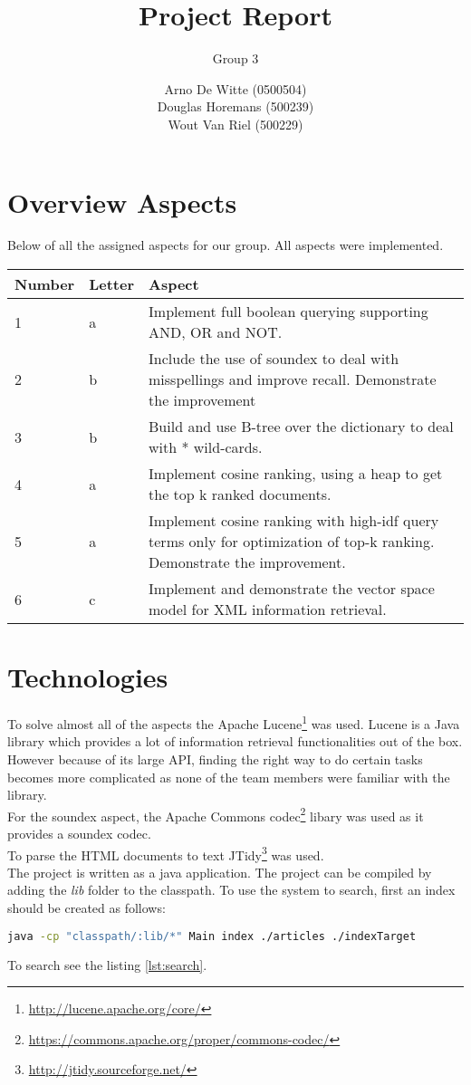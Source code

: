 \documentclass{article}
\title{Project Report}
\subtitle{Group 3}
\author{Arno De Witte (0500504)\\Douglas Horemans (500239)\\Wout Van Riel (500229)}
\begin{document}
\maketitle


\section{Overview Aspects}
Below of all the assigned aspects for our group. All aspects were implemented. \\
\begin{center}
	\begin{tabular}{ | l | l | p{10cm} |}
		\hline
		Number & Letter & Aspect                                                                    \\ \hline
		1      & a      & Implement full boolean querying supporting AND, OR and NOT.               \\ \hline
		2      & b      & Include the use of soundex to deal with misspellings and improve recall.
		Demonstrate the improvement \\ \hline
		3      & b      & Build and use B-tree over the dictionary to deal with * wild-cards.       \\ \hline
		4      & a      & Implement cosine ranking, using a heap to get the top k ranked documents. \\ \hline
		5      & a      & Implement cosine ranking with high-idf query terms only for optimization
		of top-k ranking. Demonstrate the improvement. \\ \hline
		6      & c      & Implement and demonstrate the vector space model for XML information
		retrieval. \\
		\hline
	\end{tabular}
\end{center}

\section{Technologies}
To solve almost all of the aspects the Apache Lucene\footnote{\url{http://lucene.apache.org/core/}} was used. Lucene is a Java library which provides a lot of information retrieval functionalities out of the box. However because of its large API, finding the right way to do certain tasks becomes more complicated as none of the team members were familiar with the library. \\
For the soundex aspect, the Apache Commons codec\footnote{\url{https://commons.apache.org/proper/commons-codec/}} libary was used as it provides a soundex codec.\\
To parse the HTML documents to text JTidy\footnote{\url{http://jtidy.sourceforge.net/}} was used.\\
The project is written as a java application. The project can be compiled by adding the \emph{lib} folder to the classpath. To use the system to search, first an index should be created as follows:
\begin{lstlisting}[language=Bash]
java -cp "classpath/:lib/*" Main index ./articles ./indexTarget
\end{lstlisting}
To search see the listing \ref{lst:search}.
\end{document}
